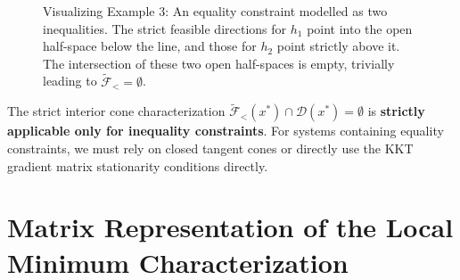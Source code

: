 \documentclass[11pt]{article}
\theoremstyle{definition}
\theoremstyle{plain}
\theoremstyle{remark}
\begin{document}
\begin{figure}[H]
    \centering
    \caption{Visualizing Example 3: An equality constraint modelled as two inequalities. The strict feasible directions for $h_1$ point into the open half-space below the line, and those for $h_2$ point strictly above it. The intersection of these two open half-spaces is empty, trivially leading to $\widetilde{\mathcal{F}}_{<} = \emptyset$.}
    \label{fig:ex_equality}
\end{figure}

\begin{tcolorbox}[colframe=red!70!black, colback=red!5!white, title=Important Limitation]
  The strict interior cone characterization $\widetilde{\mathcal{F}}_{<}(x^*) \cap \mathcal{D}(x^*) = \emptyset$ is \textbf{strictly applicable only for inequality constraints}. For systems containing equality constraints, we must rely on closed tangent cones or directly use the KKT gradient matrix stationarity conditions directly.
\end{tcolorbox}

\section{Matrix Representation of the Local Minimum Characterization}
\end{document}
